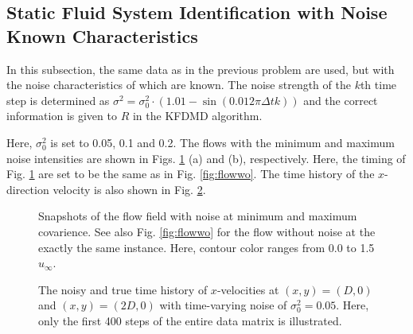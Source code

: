 \documentclass[aip,graphicx]{revtex4-1}
\begin{document}
\subsection{Static Fluid System Identification with Noise Known Characteristics}
\label{sec:FluidWN}
In this subsection, the same data as in the previous problem are used, but with the noise characteristics of which are known. The noise strength of the $k$th time step is determined as $\sigma^2 = \sigma_0^2 \cdot \left( 1.01 - \sin\left( 0.012 \pi \Delta t k\right)\right) $ and the correct information is given to $R$ in the KFDMD algorithm.

Here, $\sigma_0^2$ is set to 0.05, 0.1 and 0.2. The flows with the minimum and maximum noise intensities are shown in Figs. \ref{fig:flowwnoise} (a) and (b), respectively. Here, the timing of Fig. \ref{fig:flowwnoise} are set to be the same as in Fig. \ref{fig:flowwo}. The time history of the $x$-direction velocity is also shown in Fig. \ref{fig:cylhist}.

\begin{figure}
	\caption{Snapshots of the flow field with noise at minimum and maximum covarience. See also Fig. \ref{fig:flowwo} for the flow without noise at the exactly the same instance. Here, contour color ranges from 0.0 to 1.5$u_\infty$.}
	\label{fig:flowwnoise} 
\end{figure}

\begin{figure}
	\caption{The noisy and true time history of $x$-velocities at $(x,y)=(D,0)$  and $(x,y)=(2D,0)$ with time-varying noise of $\sigma_0^2=0.05$. Here, only the first 400 steps of the entire data matrix is illustrated. }
	\label{fig:cylhist}
\end{figure}
\end{document}
